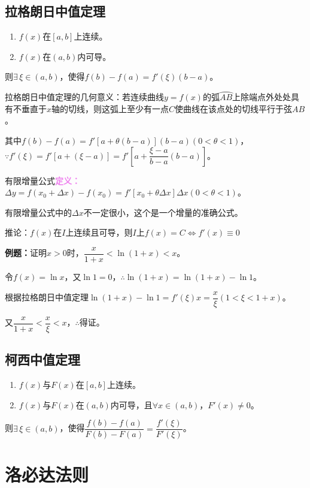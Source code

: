 \documentclass[UTF8, 12pt]{ctexart}
\begin{document}
\subsection{拉格朗日中值定理}

\begin{enumerate}
    \item $f(x)$在$[a,b]$上连续。
    \item $f(x)$在$(a,b)$内可导。
\end{enumerate}

则$\exists\,\xi\in(a,b)$，使得$f(b)-f(a)=f'(\xi)(b-a)$。

拉格朗日中值定理的几何意义：若连续曲线$y=f(x)$的弧$\wideparen{AB}$上除端点外处处具有不垂直于$x$轴的切线，则这弧上至少有一点$C$使曲线在该点处的切线平行于弦$AB$。

其中$f(b)-f(a)=f'[a+\theta(b-a)](b-a)(0<\theta<1)$，$\because f'(\xi)=f'[a+(\xi-a)]=f'[a+\dfrac{\xi-a}{b-a}(b-a)]$。\medskip

有限增量公式\textcolor{violet}{\textbf{定义：}}$\Delta y=f(x_0+\Delta x)-f(x_0)=f'[x_0+\theta\Delta x]\Delta x(0<\theta<1)$。

有限增量公式中的$\Delta x$不一定很小，这个是一个增量的准确公式。

推论：$f(x)$在$I$上连续且可导，则$I$上$f(x)=C\Leftrightarrow f'(x)\equiv 0$

\textbf{例题：}证明$x>0$时，$\dfrac{x}{1+x}<\ln(1+x)<x$。

令$f(x)=\ln x$，又$\ln 1=0$，$\therefore\ln(1+x)=\ln(1+x)-\ln 1$。

根据拉格朗日中值定理$\ln(1+x)-\ln 1=f'(\xi)x=\dfrac{x}{\xi}(1<\xi<1+x)$。

又$\dfrac{x}{1+x}<\dfrac{x}{\xi}<x$，$\therefore$得证。

\subsection{柯西中值定理}

\begin{enumerate}
    \item $f(x)$与$F(x)$在$[a,b]$上连续。
    \item $f(x)$与$F(x)$在$(a,b)$内可导，且$\forall x\in(a,b)$，$F'(x)\neq 0$。
\end{enumerate}

则$\exists\,\xi\in(a,b)$，使得$\dfrac{f(b)-f(a)}{F(b)-F(a)}=\dfrac{f'(\xi)}{F'(\xi)}$。

\section{洛必达法则}
\end{document}
